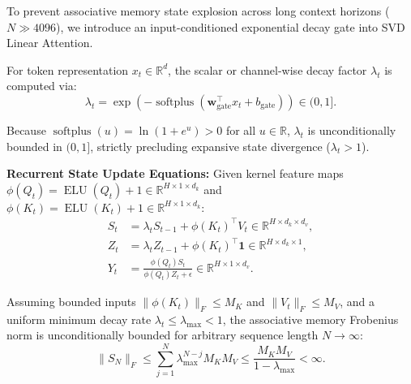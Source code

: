 To prevent associative memory state explosion across long context horizons ($N \gg 4096$), we introduce an input-conditioned exponential decay gate into SVD Linear Attention.

For token representation $x_t \in \mathbb{R}^d$, the scalar or channel-wise decay factor $\lambda_t$ is computed via:
\begin{equation}
\label{eq:decay_gate}
\lambda_t = \exp\left(-\operatorname{softplus}\left(\mathbf{w}_{\text{gate}}^\top x_t + b_{\text{gate}}\right)\right) \in (0, 1].
\end{equation}

Because $\operatorname{softplus}(u) = \ln(1 + e^u) > 0$ for all $u \in \mathbb{R}$, $\lambda_t$ is unconditionally bounded in $(0, 1]$, strictly precluding expansive state divergence ($\lambda_t > 1$).

\textbf{Recurrent State Update Equations:}
Given kernel feature maps $\phi(Q_t) = \operatorname{ELU}(Q_t) + 1 \in \mathbb{R}^{H \times 1 \times d_k}$ and $\phi(K_t) = \operatorname{ELU}(K_t) + 1 \in \mathbb{R}^{H \times 1 \times d_k}$:
\begin{align}
S_t &= \lambda_t S_{t-1} + \phi(K_t)^\top V_t \in \mathbb{R}^{H \times d_k \times d_v}, \label{eq:state_S} \\
Z_t &= \lambda_t Z_{t-1} + \phi(K_t)^\top \mathbf{1} \in \mathbb{R}^{H \times d_k \times 1}, \label{eq:state_Z} \\
Y_t &= \frac{\phi(Q_t) S_t}{\phi(Q_t) Z_t + \epsilon} \in \mathbb{R}^{H \times 1 \times d_v}. \label{eq:output_Y}
\end{align}

\begin{theorem}
Assuming bounded inputs $\|\phi(K_t)\|_F \le M_K$ and $\|V_t\|_F \le M_V$, and a uniform minimum decay rate $\lambda_t \le \lambda_{\max} < 1$, the associative memory Frobenius norm is unconditionally bounded for arbitrary sequence length $N \to \infty$:
\begin{equation}
\|S_N\|_F \le \sum_{j=1}^N \lambda_{\max}^{N-j} M_K M_V \le \frac{M_K M_V}{1 - \lambda_{\max}} < \infty.
\end{equation}
\end{theorem}
